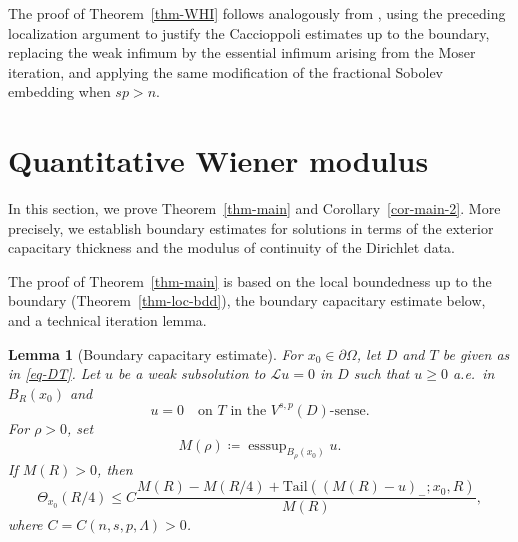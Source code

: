 \documentclass[11pt]{amsart}
\theoremstyle{plain}
\newtheorem{lemma}[theorem]{Lemma}
\theoremstyle{definition}
\numberwithin{equation}{section}
\DeclareMathOperator*{\esssup}{esssup}
\begin{document}
The proof of Theorem~\ref{thm-WHI} follows analogously from \cite[Theorem~3.7]{KLL23}, using the preceding localization argument to justify the Caccioppoli estimates up to the boundary, replacing the weak infimum by the essential infimum arising from the Moser iteration, and applying the same modification of the fractional Sobolev embedding when $sp>n$.





\section{Quantitative Wiener modulus}
\label{sec:Wiener}

In this section, we prove Theorem~\ref{thm-main} and Corollary~\ref{cor-main-2}. More precisely, we establish boundary estimates for solutions in terms of the exterior capacitary thickness and the modulus of continuity of the Dirichlet data.

The proof of Theorem~\ref{thm-main} is based on the local boundedness up to the boundary (Theorem~\ref{thm-loc-bdd}), the boundary capacitary estimate below, and a technical iteration lemma.

\begin{lemma}[Boundary capacitary estimate]\label{lem-cap-est}
For $x_0 \in \partial \Omega$, let $D$ and $T$ be given as in \eqref{eq-DT}. Let $u$ be a weak subsolution to $\mathcal{L}u=0$ in $D$ such that $u \geq 0$ a.e.\ in $B_R(x_0)$ and
\begin{equation}\label{eq-u-vanish-T}
u=0 \quad\text{on }T \text{ in the $V^{s,p}(D)$-sense}.
\end{equation}
For $\rho>0$, set
\begin{equation*}
M(\rho) \coloneqq \esssup_{B_\rho(x_0)}{u}.
\end{equation*}
If $M(R) > 0$, then
\begin{equation*}
\Theta_{x_0}(R/4) \leq C \frac{M(R)-M(R/4)+\mathrm{Tail}((M(R)-u)_-; x_0, R)}{M(R)},
\end{equation*}
where $C=C(n, s, p, \Lambda)>0$.
\end{lemma}
\end{document}
